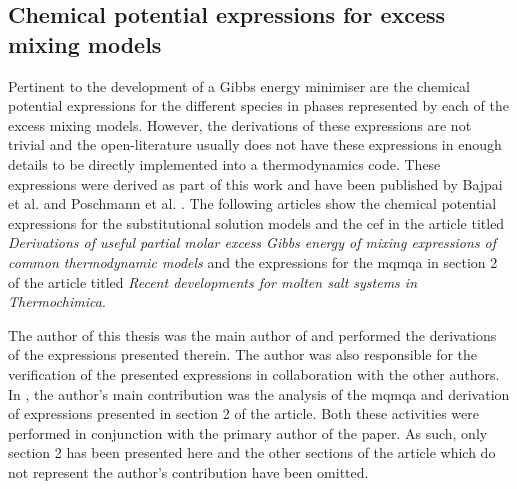	\subsection{Chemical potential expressions for excess mixing models}\label{sec:ChemPotExp}
	Pertinent to the development of a Gibbs energy minimiser are the chemical potential expressions for the different species in phases represented by each of the excess mixing models. However, the derivations of these expressions are not trivial and the open-literature usually does not have these expressions in enough details to be directly implemented into a thermodynamics code. These expressions were derived as part of this work and have been published by Bajpai {et al.} \cite{Bajpai:2021aa} and Poschmann {et al.} \cite{Poschmann:2021ab}. The following articles show the chemical potential expressions for the substitutional solution models and the \gls{cef} in the article titled \textit{Derivations of useful partial molar excess Gibbs energy of mixing expressions of common thermodynamic models} and the expressions for the \gls{mqmqa} in section 2 of the article titled \textit{Recent developments for molten salt systems in Thermochimica}. 
	
	The author of this thesis was the main author of \cite{Bajpai:2021aa} and performed the derivations of the expressions presented therein. The author was also responsible for the verification  of the presented expressions in collaboration with the other authors. In \cite{Poschmann:2021ab}, the author's main contribution was the analysis of the \gls{mqmqa} and derivation of expressions presented in section 2 of the article. Both these activities were performed in conjunction with the primary author of the paper. As such, only section 2 has been presented here and the other sections of the article which do not represent the author's contribution have been omitted.	
	
	
